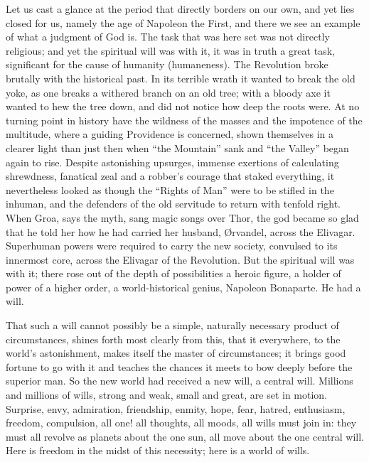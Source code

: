 \documentclass[12pt,a4paper,openany]{book}
\newcommand{\opage}[1]{\marginnote{\footnotesize\textit{[#1]}}}
\begin{document}
Let us cast a glance at the period that directly
borders on our own, and yet lies closed
\setcounter{footnote}{0}%
\opage{93}for us, namely the age of Napoleon the First, and there we
see an example of what a judgment of God is. The task
that was here set was not directly religious; and yet
the spiritual will was with it, it was in truth a great task, significant
for the cause of humanity (humaneness).
The Revolution broke brutally with the historical
past. In its terrible wrath it wanted to break
the old yoke, as one breaks a withered branch
on an old tree; with a bloody axe it wanted to hew
the tree down, and did not notice how deep the roots were.
At no turning point in history have the wildness of the masses
and the impotence of the multitude, where a guiding Providence is concerned,
shown themselves in a clearer light than just then when ``the Mountain'' sank
and ``the Valley'' began again to rise. Despite astonishing
upsurges, immense exertions of calculating
shrewdness, fanatical zeal and a robber's courage that staked
everything, it nevertheless looked as though the ``Rights of Man''
were to be stifled in the inhuman, and the defenders
of the old servitude to return with tenfold
right. When Groa, says the myth, sang magic songs
over Thor, the god became so glad that he told her
how he had carried her husband, Ørvandel,
across the Elivagar. Superhuman powers were required
to carry the new society, convulsed to its innermost core,
across the Elivagar of the Revolution. But the spiritual will
was with it; there rose out of the depth of possibilities a
heroic figure, a holder of power of a higher order, a
world-historical genius, Napoleon Bonaparte. He had
a will.

That such a will cannot possibly be a simple,
naturally necessary product of circumstances, shines
forth most clearly from this, that it everywhere, to the
\setcounter{footnote}{0}%
\opage{94}world's astonishment, makes itself the master of circumstances; it brings good fortune to go with it and teaches the
chances it meets to bow deeply before the superior man.
So the new world had received a new will,
a central will. Millions and millions of wills, strong
and weak, small and great, are set in motion. Surprise,
envy, admiration, friendship, enmity,
hope, fear, hatred, enthusiasm, freedom, compulsion, all
one! all thoughts, all moods, all wills must
join in: they must all revolve as %
planets about the one
sun, all move about the one central will. Here
is freedom in the midst of this necessity; here is a world
of wills.
\end{document}
